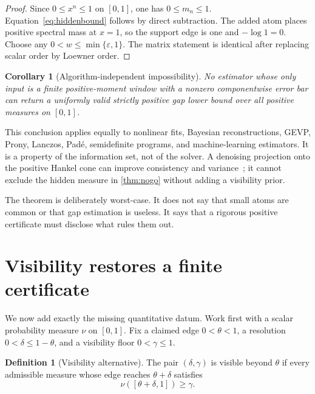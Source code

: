 \documentclass[11pt]{article}
\newtheorem{corollary}[theorem]{Corollary}
\theoremstyle{definition}
\newtheorem{definition}[theorem]{Definition}
\theoremstyle{remark}
\newcommand{\eps}{\varepsilon}
\begin{document}
\begin{proof}
Since $0\leq x^n\leq1$ on $[0,1]$, one has $0\leq m_n\leq1$.
Equation~\eqref{eq:hiddenbound} follows by direct subtraction.  The added atom
places positive spectral mass at $x=1$, so the support edge is one and
$-\log1=0$.  Choose any $0<w\leq\min\{\eps,1\}$.  The matrix statement is identical after
replacing scalar order by Loewner order.
\end{proof}

\begin{corollary}[Algorithm-independent impossibility]  \label{cor:algorithm}
No estimator whose only input is a finite positive-moment window with a
nonzero componentwise error bar can return a uniformly valid strictly positive
gap lower bound over all positive measures on $[0,1]$.
\end{corollary}

This conclusion applies equally to nonlinear fits, Bayesian reconstructions,
GEVP, Prony, Lanczos, Pad\'e, semidefinite programs, and machine-learning
estimators.  It is a property of the information set, not of the solver.  A
denoising projection onto the positive Hankel cone can improve consistency and
variance~\cite{Yu2024}; it cannot exclude the hidden measure in
\cref{thm:nogo} without adding a visibility prior.

The theorem is deliberately worst-case.  It does not say that small atoms are
common or that gap estimation is useless.  It says that a rigorous positive
certificate must disclose what rules them out.

\section{Visibility restores a finite certificate}

We now add exactly the missing quantitative datum.  Work first with a scalar
probability measure $\nu$ on $[0,1]$.  Fix a claimed edge
$0<\theta<1$, a resolution $0<\delta\leq1-\theta$, and a visibility floor
$0<\gamma\leq1$.

\begin{definition}[Visibility alternative]
The pair $(\delta,\gamma)$ is visible beyond $\theta$ if every admissible
measure whose edge reaches $\theta+\delta$ satisfies
\begin{equation}
 \nu([\theta+\delta,1])\geq\gamma.                    \label{eq:visibility}
\end{equation}
\end{definition}
\end{document}

